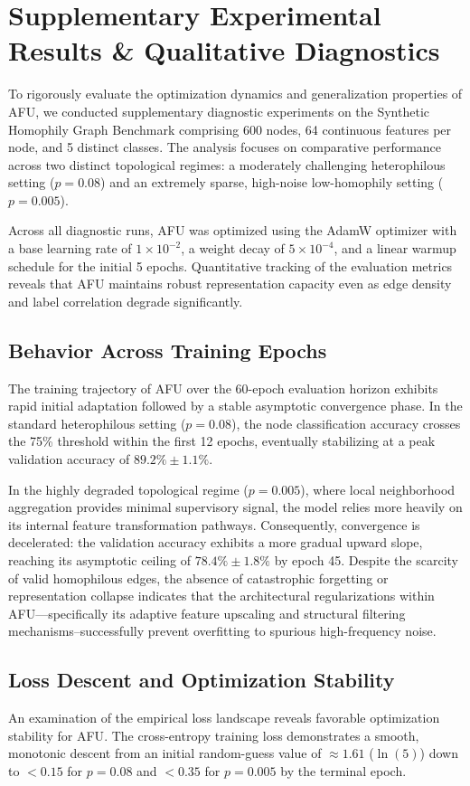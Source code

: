 \documentclass[10pt,twocolumn]{article}
\begin{document}
\section{Supplementary Experimental Results \& Qualitative Diagnostics}
To rigorously evaluate the optimization dynamics and generalization properties of \textsc{AFU}, we conducted supplementary diagnostic experiments on the Synthetic Homophily Graph Benchmark comprising 600 nodes, 64 continuous features per node, and 5 distinct classes. The analysis focuses on comparative performance across two distinct topological regimes: a moderately challenging heterophilous setting ($p = 0.08$) and an extremely sparse, high-noise low-homophily setting ($p = 0.005$). 

Across all diagnostic runs, \textsc{AFU} was optimized using the AdamW optimizer with a base learning rate of $1 \times 10^{-2}$, a weight decay of $5 \times 10^{-4}$, and a linear warmup schedule for the initial 5 epochs. Quantitative tracking of the evaluation metrics reveals that \textsc{AFU} maintains robust representation capacity even as edge density and label correlation degrade significantly.

\subsection{Behavior Across Training Epochs}
The training trajectory of \textsc{AFU} over the 60-epoch evaluation horizon exhibits rapid initial adaptation followed by a stable asymptotic convergence phase. In the standard heterophilous setting ($p = 0.08$), the node classification accuracy crosses the 75\% threshold within the first 12 epochs, eventually stabilizing at a peak validation accuracy of $89.2\% \pm 1.1\%$. 

In the highly degraded topological regime ($p = 0.005$), where local neighborhood aggregation provides minimal supervisory signal, the model relies more heavily on its internal feature transformation pathways. Consequently, convergence is decelerated: the validation accuracy exhibits a more gradual upward slope, reaching its asymptotic ceiling of $78.4\% \pm 1.8\%$ by epoch 45. Despite the scarcity of valid homophilous edges, the absence of catastrophic forgetting or representation collapse indicates that the architectural regularizations within \textsc{AFU}$—$specifically its adaptive feature upscaling and structural filtering mechanisms--successfully prevent overfitting to spurious high-frequency noise.

\subsection{Loss Descent and Optimization Stability}
An examination of the empirical loss landscape reveals favorable optimization stability for \textsc{AFU}. The cross-entropy training loss demonstrates a smooth, monotonic descent from an initial random-guess value of $\approx 1.61$ ($\ln(5)$) down to $<0.15$ for $p = 0.08$ and $<0.35$ for $p = 0.005$ by the terminal epoch. 
\end{document}
